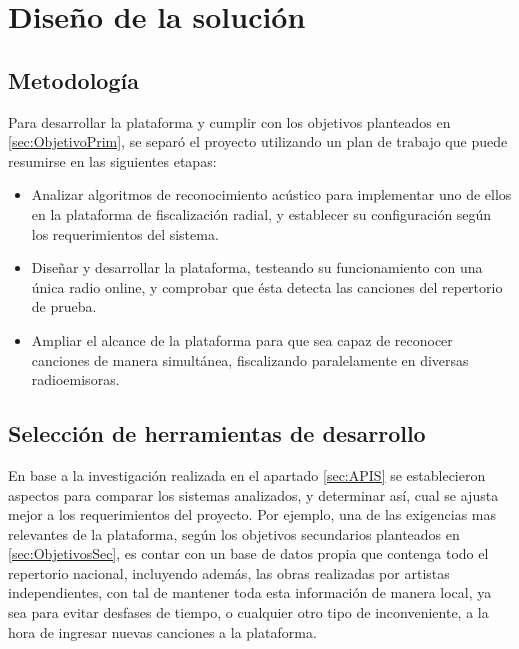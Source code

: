 
\chapter{Diseño de la solución}

\section{Metodología} \label{sec:Metodologia}



Para desarrollar la plataforma y cumplir con los objetivos planteados en \ref{sec:ObjetivoPrim}, se separó el proyecto utilizando un plan de trabajo que puede resumirse en las siguientes etapas:

\begin{itemize}
\item Analizar algoritmos de reconocimiento acústico para implementar uno de ellos en la plataforma de fiscalización radial, y establecer su configuración según los requerimientos del sistema.

\item Diseñar y desarrollar la plataforma, testeando su funcionamiento con una única radio online, y comprobar que ésta detecta las canciones del repertorio de prueba.

\item Ampliar el alcance de la plataforma para que sea capaz de reconocer canciones de manera simultánea, fiscalizando paralelamente en diversas radioemisoras.
\end{itemize}

\section{Selección de herramientas de desarrollo} \label{sec:SeleccionHerramientas}

En base a la investigación realizada en el apartado \ref{sec:APIS} se establecieron \NumElemTablaComparativaAPIS{} aspectos para comparar los sistemas analizados, y determinar así, cual se ajusta mejor a los requerimientos del proyecto. Por ejemplo, una de las exigencias mas relevantes de la plataforma, según los objetivos secundarios planteados en \ref{sec:ObjetivosSec}, es contar con un base de datos propia que contenga todo el repertorio nacional, incluyendo además, las obras realizadas por artistas independientes, con tal de mantener toda esta información de manera local, ya sea para evitar desfases de tiempo, o cualquier otro tipo de inconveniente, a la hora de ingresar nuevas canciones a la plataforma.

